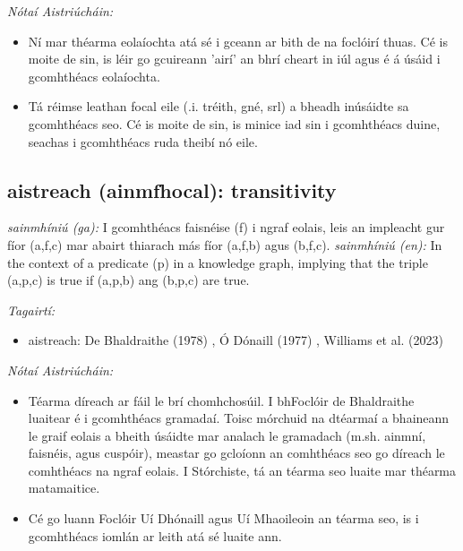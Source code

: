 \documentclass{article}
\begin{document}
 \noindent \textit{Nótaí Aistriúcháin:}
\begin{itemize}
	\item Ní mar théarma eolaíochta atá sé i gceann ar bith de na foclóirí thuas. Cé is moite de sin, is léir go gcuireann 'airí' an bhrí cheart in iúl agus é á úsáid i gcomhthéacs eolaíochta.
	\item Tá réimse leathan focal eile (.i. tréith, gné, srl) a bheadh inúsáidte sa gcomhthéacs seo. Cé is moite de sin, is minice iad sin i gcomhthéacs duine, seachas i gcomhthéacs ruda theibí nó eile.
\end{itemize}


\subsection*{aistreach (ainmfhocal): transitivity} 
 \noindent \textit{sainmhíniú (ga):} I gcomhthéacs faisnéise (f) i ngraf eolais, leis an impleacht gur fíor (a,f,c) mar abairt thiarach más fíor (a,f,b) agus (b,f,c).
\newline\newline
 \noindent \textit{sainmhíniú (en):} In the context of a predicate (p) in a knowledge graph, implying that the triple (a,p,c) is true if (a,p,b) ang (b,p,c) are true.
\newline

 \noindent \textit{Tagairtí:}
\begin{itemize}
	\item aistreach: De Bhaldraithe (1978) \cite{de-bhaldraithe}, Ó Dónaill (1977) \cite{odonaill}, Williams et al. (2023) \cite{storchiste}
\end{itemize}

 \noindent \textit{Nótaí Aistriúcháin:}
\begin{itemize}
	\item Téarma díreach ar fáil le brí chomhchosúil. I bhFoclóir de Bhaldraithe luaitear é i gcomhthéacs gramadaí. Toisc mórchuid na dtéarmaí a bhaineann le graif eolais a bheith úsáidte mar analach le gramadach (m.sh. ainmní, faisnéis, agus cuspóir), meastar go gcloíonn an comhthéacs seo go díreach le comhthéacs na ngraf eolais. I Stórchiste, tá an téarma seo luaite mar théarma matamaitice.
	\item Cé go luann Foclóir Uí Dhónaill agus Uí Mhaoileoin an téarma seo, is i gcomhthéacs iomlán ar leith atá sé luaite ann.
\end{itemize}
\end{document}
